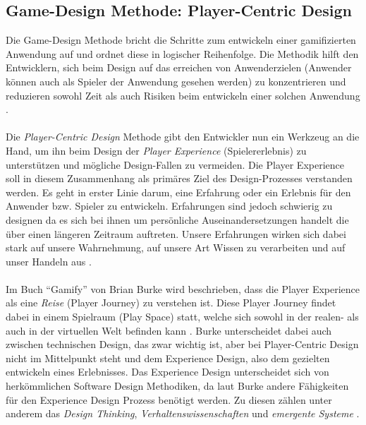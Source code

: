 \documentclass[a4paper,12pt]{scrartcl}
\begin{document}
\subsection{Game-Design Methode: Player-Centric Design}
\label{Player-Centric Methode}
Die Game-Design Methode bricht die Schritte zum entwickeln einer gamifizierten Anwendung auf und ordnet diese in logischer Reihenfolge. Die Methodik hilft den Entwicklern, sich beim Design auf das erreichen von Anwenderzielen (Anwender können auch als Spieler der Anwendung gesehen werden) zu konzentrieren und reduzieren sowohl Zeit als auch Risiken beim entwickeln einer solchen Anwendung \cite{gamificationDefinition}.
\\\\
Die \textit{Player-Centric Design} Methode gibt den Entwickler nun ein Werkzeug an die Hand, um ihn beim Design der \textit{Player Experience} (Spielererlebnis) zu unterstützen und mögliche Design-Fallen zu vermeiden. Die Player Experience soll in diesem Zusammenhang als primäres Ziel des Design-Prozesses verstanden werden. Es geht in erster Linie darum, eine Erfahrung oder ein Erlebnis für den Anwender bzw. Spieler zu entwickeln. Erfahrungen sind jedoch schwierig zu designen da es sich bei ihnen um persönliche Auseinandersetzungen handelt die über einen längeren Zeitraum auftreten. Unsere Erfahrungen wirken sich dabei stark auf unsere Wahrnehmung, auf unsere Art Wissen zu verarbeiten und auf unser Handeln aus \cite{gamificationDefinition}.
\\\\ 
Im Buch \enquote{Gamify} von Brian Burke wird beschrieben, dass die Player Experience als eine \textit{Reise} (Player Journey) zu verstehen ist. Diese Player Journey findet dabei in einem Spielraum (Play Space) statt, welche sich sowohl in der realen- als auch in der virtuellen Welt befinden kann \cite{gamificationDefinition}. Burke unterscheidet dabei auch zwischen technischen Design, das zwar wichtig ist, aber bei Player-Centric Design nicht im Mittelpunkt steht und dem Experience Design, also dem gezielten entwickeln eines Erlebnisses. Das Experience Design unterscheidet sich von herkömmlichen Software Design Methodiken, da laut Burke andere Fähigkeiten für den Experience Design Prozess benötigt werden. Zu diesen zählen unter anderem das \textit{Design Thinking}, \textit{Verhaltenswissenschaften} und \textit{emergente Systeme} \cite{gamificationDefinition}.
\\\\
\end{document}
